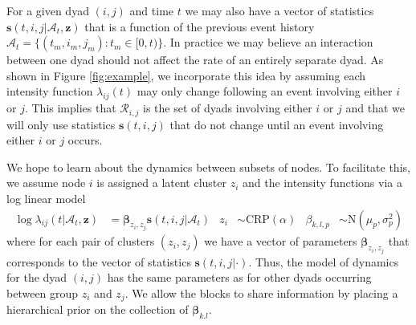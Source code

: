 \documentclass{article}
\begin{document}


%   

For a given dyad $(i,j)$ and time $t$ we may also have a vector of statistics $\mathbf{s}(t,i,j|\mathcal{A}_t,\mathbf{z})$ that is a function of the previous event history  $\mathcal{A}_t = \{(t_m,i_m,j_m): t_m \in [0,t)\}$.   In practice we may believe an interaction between one dyad should not affect the rate of an entirely separate dyad.  As shown in Figure \ref{fig:example}, we incorporate this idea by assuming each intensity function $\lambda_{ij}(t)$ may only change following an event involving either $i$ or $j$.  This implies that  $\mathcal{R}_{i,j}$ is the set of dyads involving either $i$ or $j$ and that we will only use  statistics $\mathbf{s}(t,i,j)$ that do not change until an event involving either $i$ or $j$ occurs.  

We hope to learn about the dynamics between subsets of nodes.   To facilitate this, we assume node $i$ is assigned a latent cluster $z_i$ and the intensity functions via a log linear model
\begin{align*}
\log \lambda_{ij}(t | \mathcal{A}_t,\mathbf{z}) &= \boldsymbol{\beta}_{z_i,z_j} \mathbf{s}(t,i,j|\mathcal{A}_t) &
z_i &\sim \mbox{CRP}(\alpha) &
\beta_{k,l,p} &\sim \mbox{N}(\mu_p,\sigma_p^2)
\end{align*}
where for each pair of clusters $(z_i,z_j)$ we have a vector of parameters $\boldsymbol{\beta}_{z_i,z_j}$ that corresponds to the vector of statistics $\mathbf{s}(t,i,j|\cdot)$.   Thus, the model of dynamics for the dyad $(i,j)$ has the same parameters as for other dyads occurring between group $z_i$ and $z_j$.  We allow  the blocks to share information by placing a hierarchical prior on the collection of $\boldsymbol{\beta}_{k.l}$.
\end{document}

